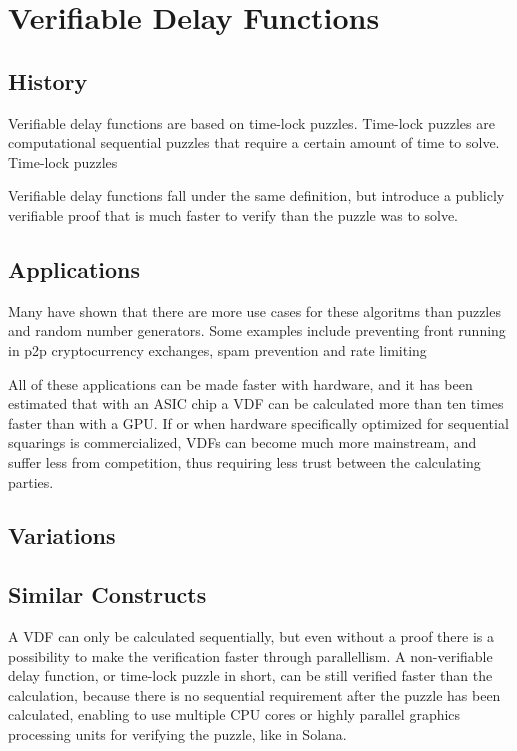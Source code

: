 \chapter{Verifiable Delay Functions}
\label{Verifiable Delay Functions}
\section{History}
Verifiable delay functions are based on time-lock puzzles. Time-lock puzzles are computational sequential puzzles that require a certain amount of time to solve.\cite{Rivest_undated-qr} Time-lock puzzles

Verifiable delay functions fall under the same definition, but introduce a publicly verifiable proof that is much faster to verify than the puzzle was to solve.

\section{Applications}

Many have shown that there are more use cases for these algoritms than puzzles and random number generators. Some examples include preventing front running in p2p cryptocurrency exchanges, spam prevention and rate limiting\cite{noauthor_undated-hk}

All of these applications can be made faster with hardware, and it has been estimated that with an ASIC chip a VDF can be calculated more than ten times faster than with a GPU. If or when hardware specifically optimized for sequential squarings is commercialized, VDFs can become much more mainstream, and suffer less from competition, thus requiring less trust between the calculating parties.

\section{Variations}


\section{Similar Constructs}
A VDF can only be calculated sequentially, but even without a proof there is a possibility to make the verification faster through parallellism. A non-verifiable delay function, or time-lock puzzle in short, can be still verified faster than the calculation, because there is no sequential requirement after the puzzle has been calculated, enabling to use multiple CPU cores or highly parallel graphics processing units for verifying the puzzle, like in Solana.\cite{Yakovenko2018-zn} 

